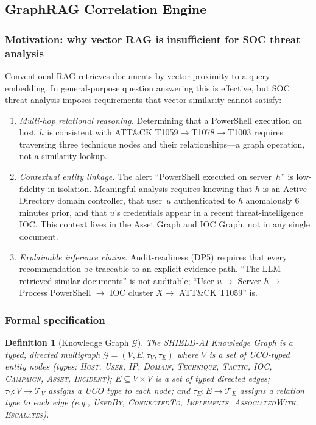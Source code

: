 \documentclass[preprint,12pt,authoryear]{elsarticle}
\newtheorem{definition}{Definition}
\begin{document}
\subsection{GraphRAG Correlation Engine}
\label{ssec:graphrag}

\subsubsection{Motivation: why vector RAG is insufficient for SOC threat analysis}

Conventional RAG retrieves documents by vector proximity to a query embedding.
In general-purpose question answering this is effective, but SOC threat analysis
imposes requirements that vector similarity cannot satisfy:
\begin{enumerate}
  \item \emph{Multi-hop relational reasoning.}
    Determining that a PowerShell execution on host~$h$ is consistent with
    ATT\&CK T1059$\to$T1078$\to$T1003 requires traversing three technique nodes
    and their relationships---a graph operation, not a similarity lookup.
  \item \emph{Contextual entity linkage.}
    The alert ``PowerShell executed on server~$h$'' is low-fidelity in isolation.
    Meaningful analysis requires knowing that $h$ is an Active Directory domain controller,
    that user~$u$ authenticated to $h$ anomalously 6 minutes prior, and that
    $u$'s credentials appear in a recent threat-intelligence IOC.
    This context lives in the Asset Graph and IOC Graph, not in any single document.
  \item \emph{Explainable inference chains.}
    Audit-readiness (DP5) requires that every recommendation be traceable to an
    explicit evidence path.
    ``The LLM retrieved similar documents'' is not auditable;
    ``User $u \to$ Server $h \to$ Process PowerShell $\to$ IOC cluster $X \to$
    ATT\&CK T1059'' is.
\end{enumerate}

\subsubsection{Formal specification}

\begin{definition}[Knowledge Graph $\mathcal{G}$]
\label{def:kg}
The SHIELD-AI Knowledge Graph is a typed, directed multigraph
$\mathcal{G} = (V, E, \tau_V, \tau_E)$ where
$V$ is a set of UCO-typed entity nodes
(types: \textsc{Host}, \textsc{User}, \textsc{IP}, \textsc{Domain},
\textsc{Technique}, \textsc{Tactic}, \textsc{IOC}, \textsc{Campaign}, \textsc{Asset},
\textsc{Incident});
$E \subseteq V \times V$ is a set of typed directed edges;
$\tau_V: V \to \mathcal{T}_V$ assigns a UCO type to each node; and
$\tau_E: E \to \mathcal{T}_E$ assigns a relation type to each edge
(e.g., \textsc{UsedBy}, \textsc{ConnectedTo}, \textsc{Implements},
\textsc{AssociatedWith}, \textsc{Escalates}).
\end{definition}
\end{document}
